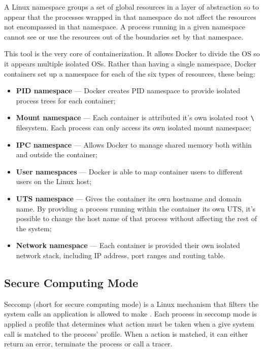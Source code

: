 A Linux namespace groups a set of global resources in a layer of abstraction so to appear that the processes wrapped in that namespace do not affect the resources not encompassed in that namespace\cite{namespaces-linux, namespaces}. A process running in a given namespace cannot see or use the resources out of the boundaries set by that namespace.

This tool is the very core of containerization. It allows Docker to divide the \ac{OS} so it appears multiple isolated \acp{OS}\cite{namespaces-docker}. Rather than having a single namespace, Docker containers set up a namespace for each of the six types of resources\cite{Poulton2020-ju}, these being:

\begin{itemize}
    \item \textbf{\ac{PID} namespace} --- Docker creates \ac{PID} namespace to provide isolated process trees for each container;
    \item \textbf{Mount namespace} --- Each container is attributed it's own isolated root \texttt{\textbackslash} filesystem. Each process can only access its own isolated mount namespace;
    \item \textbf{\ac{IPC} namespace} --- Allows Docker to manage shared memory both within and outside the container;
    \item \textbf{User namespaces} --- Docker is able to map container users to different users on the Linux host;
    \item \textbf{\ac{UTS} namespace} --- Gives the container its own hostname and domain name. By providing a process running within the container its own \ac{UTS}, it's possible to change the host name of that process without affecting the rest of the system;
    \item \textbf{Network namespace} --- Each container is provided their own isolated network stack, including \acs{IP} address, port ranges and routing table.
\end{itemize}


\subsection{Secure Computing Mode}
\label{ssec::security:sec-compt}

Seccomp (short for secure computing mode) is a Linux mechanism that filters the system calls an application is allowed to make \cite{seccomp-man}. Each process in seccomp mode is applied a profile that determines what action must be taken when a give system call is matched to the process' profile. When a action is matched, it can either return an error, terminate the process or call a tracer.

